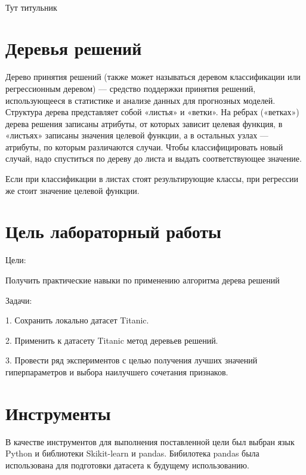 \documentclass[a4paper,12pt]{article}
\begin{document}
\begin{titlepage}
\newpage

\

Тут титульник
\end{titlepage}

\newpage
\tableofcontents
\setcounter{page}{2}



\newpage\section{Деревья решений} 
	Дерево принятия решений (также может называться деревом классификации или регрессионным деревом) — средство поддержки принятия решений, использующееся в статистике и анализе данных для прогнозных моделей. Структура дерева представляет собой «листья» и «ветки». На ребрах («ветках») дерева решения записаны атрибуты, от которых зависит целевая функция, в «листьях» записаны значения целевой функции, а в остальных узлах — атрибуты, по которым различаются случаи. Чтобы классифицировать новый случай, надо спуститься по дереву до листа и выдать соответствующее значение. 
	
	\vspace{0.5cm}
	Если при классификации в листах стоят результирующие классы, при регрессии же стоит значение целевой функции.
	
	
	
\newpage\section{Цель лабораторный работы} 
	Цели: 
	\vspace{0.5cm}
	
	Получить практические навыки по применению алгоритма дерева решений
	
	\vspace{0.5cm}
	Задачи: 
	
	\vspace{0.5cm}
	1. Сохранить локально датасет Titanic.
	
	\vspace{0.5cm}
	2. Применить к датасету Titanic метод деревьев решений.
	
	\vspace{0.5cm}
	3. Провести ряд экспериментов с целью получения лучших значений гиперпараметров и выбора наилучшего сочетания признаков.
	
\newpage\section{Инструменты} 
	В качестве инструментов для выполнения поставленной цели был выбран язык Python и библиотеки Skikit-learn и pandas.
	Бибилотека pandas была использована для подготовки датасета к будущему использованию.
	
\end{document}
